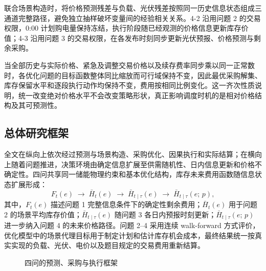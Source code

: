 联合场景构造时，将价格预测残差与负载、光伏残差按照同一历史信息状态组成三通道完整路径，避免独立抽样破坏变量间的经验相关关系。4-2 沿用问题 2 的交易权限，0:00 计划购电量保持冻结，执行阶段随已经观测的价格信息更新库存价值；4-3 沿用问题 3 的交易权限，在各发布时刻同步更新光伏预报、价格预测与剩余采购。

当全部历史与实际价格、紧急及调整交易价格以及续存费率同步乘以同一正常数时，各优化问题的目标函数整体同比缩放而可行域保持不变，因此最优采购解集、库存保留水平和逐段执行动作均保持不变，费用按相同比例变化。这一齐次性质说明，统一改变绝对价格水平不会改变策略形状，真正影响调度时机的是相对价格结构及其可预测性。

\subsection{总体研究框架}
全文在纵向上依次经过预测与场景构造、采购优化、因果执行和实际结算；在横向上随着问题推进，决策环境由确定信息扩展至供需随机性、日内信息更新和价格不确定性。四问共享同一储能物理约束和基本优化结构，库存未来费用函数随信息状态扩展形成：
\begin{equation}
F_t(e)\;\longrightarrow\;\bar H_t(e)\;\longrightarrow\;\bar H_{t\mid\tau}(e)\;\longrightarrow\;\bar H_{t\mid\tau}(e;\,p),
\label{eq:chain}
\end{equation}
其中，$F_t(e)$ 描述问题 1 完整信息条件下的确定性剩余费用；$\bar H_t(e)$ 用于问题 2 的场景平均库存价值；$\bar H_{t\mid\tau}(e)$ 随问题 3 各日内预报时刻更新；$\bar H_{t\mid\tau}(e;\,p)$ 进一步纳入问题 4 的未来价格路径。问题 2--4 采用连续 walk-forward 方式评价，优化模型中的场景代理目标用于制定计划和估计库存机会成本，最终结果统一按真实实现的负载、光伏、电价以及题目规定的交易费用重新结算。

\begin{figure}[!htbp]\centering
{}
\caption{四问的预测、采购与执行框架}
\label{fig:framework}
\end{figure}
